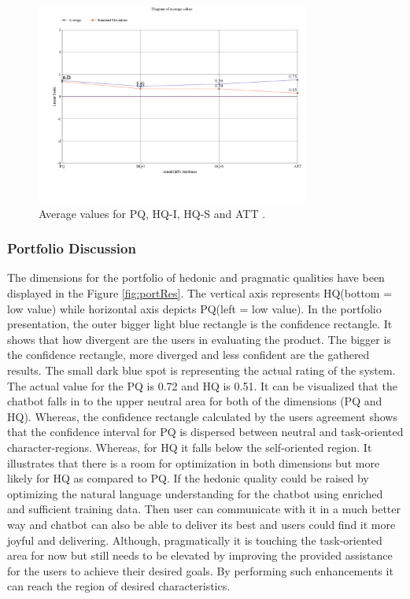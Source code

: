 \begin{figure}[!h]
    \centering
    \includegraphics[width=0.8\textwidth]{img/Diagram_for_Avg_Values.png}
    \caption{Average values for PQ, HQ-I, HQ-S and ATT \cite{attrakdiff}.}
    \label{fig:avgValAttrak}
\end{figure}

\subsubsection*{Portfolio Discussion}
The dimensions for the portfolio of hedonic and pragmatic qualities have been displayed in the Figure \ref{fig:portRes}. The vertical axis represents HQ(bottom = low value) while horizontal axis depicts PQ(left = low value). In the portfolio presentation, the outer bigger light blue rectangle is the confidence rectangle. It shows that how divergent are the users in evaluating the product. The bigger is the confidence rectangle, more diverged and less confident are the gathered results. The small dark blue spot is representing the actual rating of the system. The actual value for the PQ is 0.72 and HQ is 0.51. It can be visualized that the chatbot falls in to the upper neutral area for both of the dimensions (PQ and HQ). Whereas, the confidence rectangle calculated by the users agreement shows that the confidence interval for PQ is dispersed between neutral and task-oriented character-regions. Whereas, for HQ it falls below the self-oriented region. It illustrates that there is a room for optimization in both dimensions but more likely for HQ as compared to PQ. If the hedonic quality could be raised by optimizing the natural language understanding for the chatbot using enriched and sufficient training data. Then user can communicate with it in a much better way and chatbot can also be able to deliver its best and users could find it more joyful and delivering. Although, pragmatically it is touching the task-oriented area for now but still needs to be elevated by improving the provided assistance for the users to achieve their desired goals. By performing such enhancements it can reach the region of desired characteristics.

